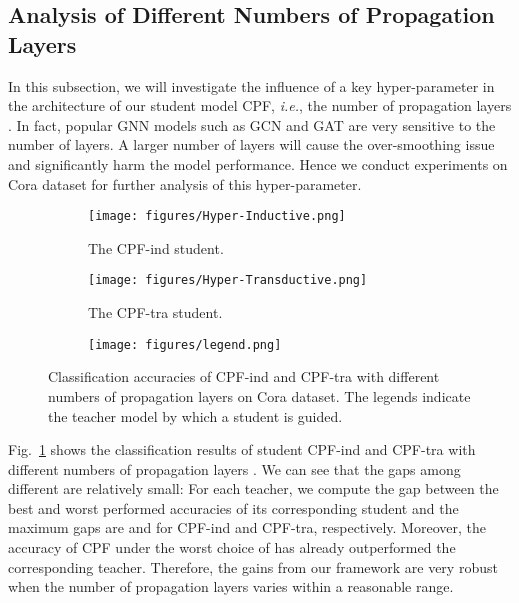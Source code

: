 \documentclass[sigconf]{acmart}
\begin{document}
\subsection{Analysis of Different Numbers of Propagation Layers}In this subsection, we will investigate the influence of a key hyper-parameter in the architecture of our student model CPF,  \textit{i.e.}, the number of propagation layers . In fact, popular GNN models such as GCN and GAT are very sensitive to the number of layers. A larger number of layers will cause the over-smoothing issue and significantly harm the model performance. Hence we conduct experiments on Cora dataset for further analysis of this hyper-parameter.
\begin{figure}[htb]
\centering
    \begin{subfigure}{0.42\columnwidth}
		\centering
		\texttt{[image: figures/Hyper-Inductive.png]}
		\caption{The CPF-ind student.}
	\end{subfigure}
	\begin{subfigure}{0.42\columnwidth}
		\centering
		\texttt{[image: figures/Hyper-Transductive.png]}
		\caption{The CPF-tra student.}
	\end{subfigure}
	\begin{subfigure}{0.14\columnwidth}
		\centering
		\texttt{[image: figures/legend.png]}
	\end{subfigure}
\caption{Classification accuracies of CPF-ind and CPF-tra with different numbers of propagation layers on Cora dataset. The legends indicate the teacher model by which a student is guided.}
\label{fig:layer}
\end{figure}

Fig.~\ref{fig:layer} shows the classification results of student CPF-ind and CPF-tra with different numbers of propagation layers . We can see that the gaps among different  are relatively small: For each teacher, we compute the gap between the best and worst performed accuracies of its corresponding student and the maximum gaps are  and  for CPF-ind and CPF-tra, respectively. Moreover, the accuracy of CPF under the worst choice of  has already outperformed the corresponding teacher. Therefore, the gains from our framework are very robust when the number of propagation layers  varies within a reasonable range.
\end{document}
